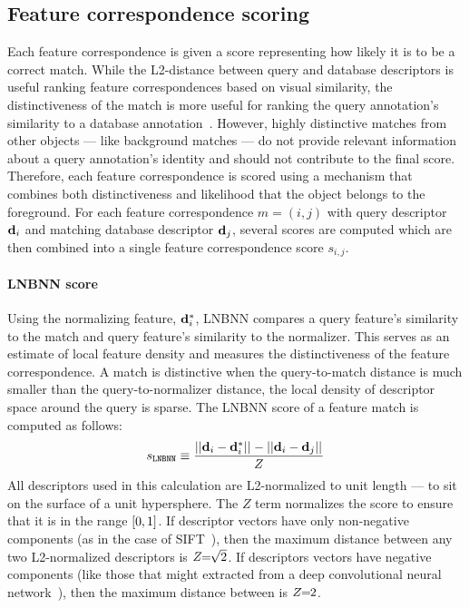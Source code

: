     \subsection{Feature correspondence scoring}
        Each feature correspondence is given a score representing how likely it is to be a correct match. While the
        L2-distance between query and database descriptors is useful ranking feature correspondences based on
        visual similarity, the distinctiveness of the match is more useful for ranking the query annotation's
        similarity to a database annotation~\cite{lowe_distinctive_2004, arandjelovic_dislocation_2015,
        mccann_local_2012}. However, highly distinctive matches from other objects --- like background matches ---
        do not provide relevant information about a query annotation's identity and should not contribute to the
        final score. Therefore, each feature correspondence is scored using a mechanism that combines both
        distinctiveness and likelihood that the object belongs to the foreground. For each feature correspondence
        $m = (i, j)$ with query descriptor $\mathbf{d}_i$ and matching database descriptor $\mathbf{d}_j$, several scores are
        computed which are then combined into a single feature correspondence score $s_{i,j}$.

        \paragraph{LNBNN score}\label{sec:lnbnnscore}

            Using the normalizing feature, $\mathbf{d}^{*}_{i}$, LNBNN compares a query feature's similarity to the
            match and query feature's similarity to the normalizer. This serves as an estimate of local feature
            density and measures the distinctiveness of the feature correspondence. A match is distinctive when the
            query-to-match distance is much smaller than the query-to-normalizer distance, \ie{} the local density
            of descriptor space around the query is sparse. The LNBNN score of a feature match is computed as
            follows:
            \begin{equation}\label{eqn:lnbnn}
                s_{\tt{LNBNN}} \equiv \frac{||\mathbf{d}_i - \mathbf{d}^{*}_{i}||_{} - ||\mathbf{d}_i - \mathbf{d}_j||_{}}{Z}
            \end{equation}
            All descriptors used in this calculation are L2-normalized to unit length --- \ie{} to sit on the
            surface of a unit hypersphere. The $Z$ term normalizes the score to ensure that it is in the range
            $[0, 1]$. If descriptor vectors have only non-negative components (as in the case of
            SIFT~\cite{lowe_distinctive_2004}), then the maximum distance between any two L2-normalized descriptors
            is $Z\mkern-6mu=\mkern-6mu\sqrt{2}$. If descriptors vectors have negative components (like those that might
            extracted from a deep convolutional neural network~\cite{zagoruyko_learning_2015}), then the maximum
            distance between is $Z\mkern-6mu=\mkern-6mu2$.

